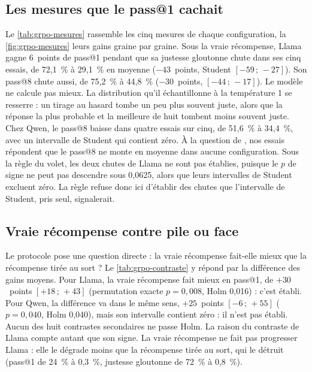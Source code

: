 \subsection{Les mesures que le pass@1 cachait}

Le \cref{tab:grpo-mesures} rassemble les cinq mesures de chaque configuration, la \cref{fig:grpo-mesures} leurs
gains graine par graine. Sous la vraie récompense, Llama gagne 6~points de pass@1 pendant que sa justesse
gloutonne chute dans ses cinq essais, de 72,1~\% à 29,1~\% en moyenne ($-43$~points, Student
$[-59\,;\,-27]$). Son pass@8 chute aussi, de 75,2~\% à 44,8~\% ($-30$~points, $[-44\,;\,-17]$). Le modèle
ne calcule pas mieux. La distribution qu'il échantillonne à la température 1 se resserre : un tirage au
hasard tombe un peu plus souvent juste, alors que la réponse la plus probable et la meilleure de huit
tombent moins souvent juste. Chez Qwen, le pass@8 baisse dans quatre essais sur cinq, de 51,6~\% à 34,4~\%,
avec un intervalle de Student qui contient zéro. À la question de \textcite{yue2025rlvr}, nos essais
répondent que le pass@8 ne monte en moyenne dans aucune configuration. Sous la règle du volet, les deux
chutes de Llama ne sont pas établies, puisque le $p$ de signe ne peut pas descendre sous 0,0625, alors que leurs
intervalles de Student excluent zéro. La règle refuse donc ici d'établir des chutes que l'intervalle de
Student, pris seul, signalerait.



\subsection{Vraie récompense contre pile ou face}

Le protocole pose une question directe : la vraie récompense
fait-elle mieux que la récompense tirée au sort ? Le \cref{tab:grpo-contraste} y répond par la différence
des gains moyens. Pour Llama, la vraie récompense fait mieux en pass@1, de $+30$~points
$[+18\,;\,+43]$ (permutation exacte $p = 0{,}008$, Holm 0,016) : c'est établi. Pour Qwen, la différence va dans le
même sens, $+25$~points $[-6\,;\,+55]$ ($p = 0{,}040$, Holm 0,040), mais son intervalle contient zéro : il
n'est pas établi. Aucun des huit contrastes secondaires ne passe Holm. La raison du contraste de Llama
compte autant que son signe. La vraie récompense ne fait pas progresser Llama : elle le dégrade moins que la
récompense tirée au sort, qui le détruit (pass@1 de 24~\% à 0,3~\%, justesse gloutonne de 72~\% à 0,8~\%).

